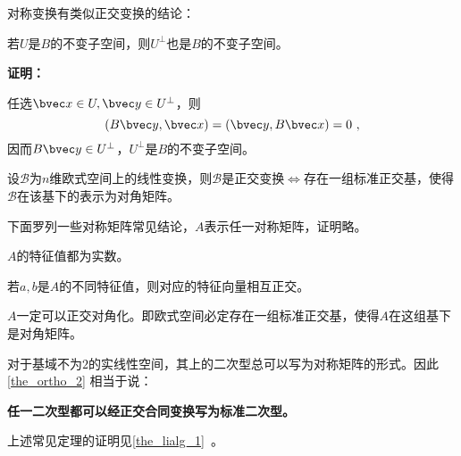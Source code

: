 对称变换有类似正交变换的结论：
\begin{theorem}{}
若$U$是$B$的不变子空间，则$U^{\bot}$也是$B$的不变子空间。
\end{theorem}
\textbf{证明：}

任选$\bvec x\in U,\bvec y\in U^{\bot}$，则
\begin{equation}
(B\bvec y,\bvec x)=(\bvec y,B\bvec x)=0~,
\end{equation}
因而$B\bvec y\in U^{\bot}$，$ U^{\bot}$是$B$的不变子空间。
\begin{exercise}{}
设$\mathcal B$为$n$维欧式空间上的线性变换，则$\mathcal B$是正交变换$\Longleftrightarrow$存在一组标准正交基，使得$\mathcal B$在该基下的表示为对角矩阵。
\end{exercise}
下面罗列一些对称矩阵常见结论，$A$表示任一对称矩阵，证明略。
\begin{theorem}{}
$A$的特征值都为实数。
\end{theorem}
\begin{theorem}{}
若$a,b$是$A$的不同特征值，则对应的特征向量相互正交。
\end{theorem}
\begin{theorem}{}\label{the_ortho_2}
$A$一定可以正交对角化。即欧式空间必定存在一组标准正交基，使得$A$在这组基下是对角矩阵。
\end{theorem}
对于基域不为$2$的实线性空间，其上的二次型总可以写为对称矩阵的形式。因此\autoref{the_ortho_2} 相当于说：

\textbf{任一二次型都可以经正交合同变换写为标准二次型。}

上述常见定理的证明见\autoref{the_lialg_1}~。